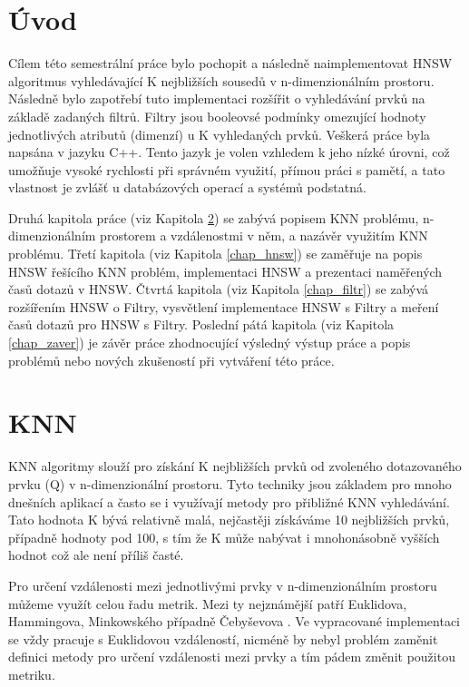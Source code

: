 \documentclass[czech,semestral,dept460,male,csharp,cpdeclaration]{diploma}
\begin{document}
	
	\MakeTitlePages
	
	\chapter{Úvod}
	
		Cílem této semestrální práce bylo pochopit a následně naimplementovat HNSW algoritmus vyhledávající K nejbližších sousedů v n-dimenzionálním prostoru. Následně bylo zapotřebí tuto implementaci rozšířit o vyhledávání prvků na základě zadaných filtrů. Filtry jsou booleovsé podmínky omezující hodnoty jednotlivých atributů (dimenzí) u K vyhledaných prvků. Veškerá práce byla napsána v jazyku C++. Tento jazyk je volen vzhledem k jeho nízké úrovni, což umožňuje vysoké rychlosti při správném využití, přímou práci s pamětí, a tato vlastnost je zvlášť u databázových operací a systémů podstatná.
		
		Druhá kapitola práce (viz Kapitola \ref{chap_knn}) se zabývá popisem KNN problému, n-dimenzionálním prostorem a vzdálenostmi v něm, a nazávěr využitím KNN problému. Třetí kapitola (viz Kapitola \ref{chap_hnsw}) se zaměřuje na popis HNSW řešícího KNN problém, implementaci HNSW a prezentaci naměřených časů dotazů v HNSW. Čtvrtá kapitola (viz Kapitola \ref{chap_filtr}) se zabývá rozšířením HNSW o Filtry, vysvětlení implementace HNSW s Filtry a meření časů dotazů pro HNSW s Filtry. Poslední pátá kapitola (viz Kapitola \ref{chap_zaver}) je závěr práce zhodnocující výsledný výstup práce a popis problémů nebo nových zkušeností při vytváření této práce.
	
	\chapter{KNN}
	\label{chap_knn}
	
		KNN algoritmy slouží pro získání K nejbližších prvků od zvoleného dotazovaného prvku (Q) v n-dimenzionální prostoru. Tyto techniky jsou základem pro mnoho dnešních aplikací a často se i využívají metody pro přibližné KNN vyhledávání. Tato hodnota K bývá relativně malá, nejčastěji získáváme 10 nejbližších prvků, případně hodnoty pod 100, s tím že K může nabývat i mnohonásobně vyšších hodnot což ale není příliš časté.
		
		Pro určení vzdálenosti mezi jednotlivými prvky v n-dimenzionálním prostoru můžeme využít celou řadu metrik. Mezi ty nejznámější patří Euklidova, Hammingova, Minkowského případně Čebyševova \cite{Metriky}. Ve vypracované implementaci se vždy pracuje s Euklidovou vzdáleností, nicméně by nebyl problém zaměnit definici metody pro určení vzdálenosti mezi prvky a tím pádem změnit použitou metriku.
		
\end{document}
